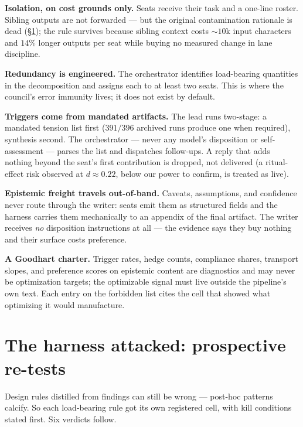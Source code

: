 \documentclass[11pt]{article}
\begin{document}
\textbf{Isolation, on cost grounds only.} Seats receive their task and
a one-line roster. Sibling outputs are not forwarded --- but the
original contamination rationale is dead (\S\ref{sec:retests}); the
rule survives because sibling context costs ${\sim}10$k input
characters and $14\%$ longer outputs per seat while buying no measured
change in lane discipline.

\textbf{Redundancy is engineered.} The orchestrator identifies
load-bearing quantities in the decomposition and assigns each to at
least two seats. This is where the council's error immunity lives; it
does not exist by default.

\textbf{Triggers come from mandated artifacts.} The lead runs
two-stage: a mandated tension list first ($391/396$ archived runs
produce one when required), synthesis second. The orchestrator ---
never any model's disposition or self-assessment --- parses the list
and dispatches follow-ups. A reply that adds nothing beyond the seat's
first contribution is dropped, not delivered (a
ritual-effect risk observed at $d\approx0.22$, below our power to
confirm, is treated as live).

\textbf{Epistemic freight travels out-of-band.} Caveats, assumptions,
and confidence never route through the writer: seats emit them as
structured fields and the harness carries them mechanically to an
appendix of the final artifact. The writer receives \emph{no}
disposition instructions at all --- the evidence says they buy nothing
and their surface costs preference.

\textbf{A Goodhart charter.} Trigger rates, hedge counts, compliance
shares, transport slopes, and preference scores on epistemic content
are diagnostics and may never be optimization targets; the optimizable
signal must live outside the pipeline's own text. Each entry on the
forbidden list cites the cell that showed what optimizing it would
manufacture.

\section{The harness attacked: prospective re-tests}
\label{sec:retests}

Design rules distilled from findings can still be wrong --- post-hoc
patterns calcify. So each load-bearing rule got its own registered
cell, with kill conditions stated first. Six verdicts follow.
\end{document}
